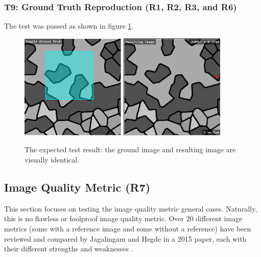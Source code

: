 \documentclass[12pt, titlepage]{article}
\begin{document}
\subsubsection{T9: Ground Truth Reproduction (R1, R2, R3, and R6)}
The test was passed as shown in figure \ref{fig_t9}.
\begin{figure}[h!]
  \begin{center}
   \includegraphics[width=5cm]{t9a.png}
   \includegraphics[width=5cm]{t9b.png}
  \caption{The expected test result: the ground image and resulting image are visually identical.}
  \label{fig_t9} 
  \end{center}
\end{figure}


\subsection{Image Quality Metric (R7)}
This section focuses on testing the image quality metric general cases. Naturally,
this is no flawless or foolproof image quality metric. Over 20 different image metrics
(some with a reference image and some without a reference) have been
reviewed and compared by Jagalingam and Hegde in a 2015 paper,
each with their different strengths and weaknesses \cite{JAGALINGAM2015133}.
\end{document}
